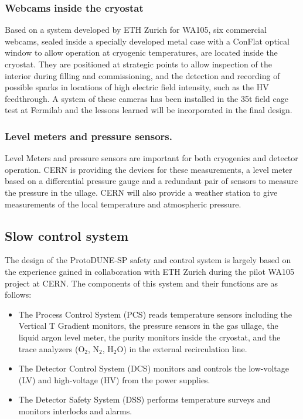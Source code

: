 \subsubsection{Webcams inside the cryostat}
	Based on %
	a system developed by ETH Zurich for WA105, six commercial webcams, sealed inside a specially developed metal case with a ConFlat optical window to allow operation at cryogenic temperatures, are located inside the cryostat. They are positioned at strategic points to allow inspection of the interior during filling and commissioning, %
	and the detection and recording of possible sparks in locations of high %
	electric field intensity, such as the HV feedthrough. A system of these cameras has been installed in the 35t field cage test at Fermilab and the lessons learned will be incorporated in the final design.
	
\subsubsection{Level meters and pressure sensors.}
	Level Meters and pressure sensors are important for both cryogenics and detector operation. CERN is providing the devices for these measurements, a level meter based on a differential pressure gauge and a redundant pair of sensors to measure the pressure in the ullage. CERN will also provide a weather station to give measurements of the local temperature and atmospheric pressure.


\subsection{Slow control system}
\label{sec:slowcontrol}

The design of the ProtoDUNE-SP safety and control system is largely based on the experience gained in collaboration with ETH Zurich during the pilot WA105 project at CERN. The components of this system and their functions are as follows:
\begin{itemize}
\item	The Process Control System (PCS) reads temperature sensors including the Vertical T Gradient monitors, 
the pressure sensors in the gas ullage, the liquid argon level meter,
the purity monitors inside the cryostat, and the trace analyzers (O$_2$, N$_2$, H$_2$O) in the external recirculation line.
\item	The Detector Control System (DCS) monitors and controls the low-voltage (LV) and high-voltage (HV) from the power supplies.
\item	The Detector Safety System (DSS) performs temperature surveys and monitors interlocks and alarms.
\end{itemize}

